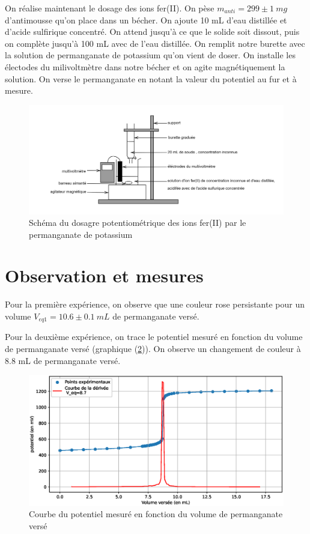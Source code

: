 \documentclass[12pt]{article}
\begin{document}
\newpage
On réalise maintenant le dosage des ions fer(II). 
On pèse $m_{anti}= 299 \pm 1 \ mg$ d'antimousse qu'on place dans un bécher.
On ajoute 10 mL d'eau distillée et d'acide sulfirique concentré.
On attend jusqu'à ce que le solide soit dissout, puis on complète jusqu'à 100 mL avec de l'eau distillée.
On remplit notre burette avec la solution de permanganate de potassium qu'on vient de doser.
On installe les électodes du milivoltmètre dans notre bécher et on agite magnétiquement la solution.
On verse le permanganate en notant la valeur du potentiel au fur et à mesure.
\begin{figure}[h!]
    \begin{center}
        \includegraphics[scale=0.15]{Dosage_fer2.png}
        \caption{Schéma du dosagre potentiométrique des ions fer(II) par le permanganate de potassium}
        \label{Img:dosage_potentiométrique}
    \end{center}
\end{figure}


\section{Observation et mesures}
Pour la première expérience, on observe que une couleur rose persistante pour un volume $V_{eq1}=10.6 \pm 0.1 \ mL$ de permanganate versé.

Pour la deuxième expérience, on trace le potentiel mesuré en fonction du volume de permanganate versé (graphique (\ref{Img:Courbe_titrage})). 
On observe un changement de couleur à 8.8 mL de permanganate versé.

\begin{figure}[p]
    \begin{center}
        \includegraphics[scale=1,angle=-90]{Titrage_FerII.eps}
        \caption{Courbe du potentiel mesuré en fonction du volume de permanganate versé}
        \label{Img:Courbe_titrage}
    \end{center}
\end{figure}
\end{document}
